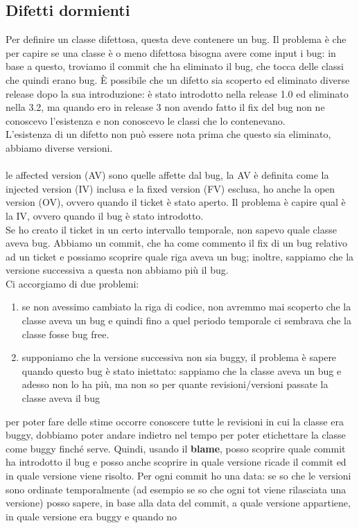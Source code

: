 \documentclass{article}
\begin{document}
\subsection{Difetti dormienti}
Per definire un classe difettosa, questa deve contenere un bug. Il problema è che per capire se una classe è o meno difettosa bisogna avere come input i bug: in base a questo, troviamo il commit che ha eliminato il bug, che tocca delle classi che quindi erano bug. È possibile che un difetto sia scoperto ed eliminato diverse release dopo la sua introduzione: è stato introdotto nella release 1.0 ed eliminato nella 3.2, ma quando ero in release 3 non avendo fatto il fix del bug non ne conoscevo l'esistenza e non conoscevo le classi che lo contenevano.\\ L'esistenza di un difetto non può essere nota prima che questo sia eliminato, abbiamo diverse versioni.\\
\\
le affected version (AV) sono quelle affette dal bug, la AV è definita come la injected version (IV) inclusa e la fixed version (FV) esclusa, ho anche la open version (OV), ovvero quando il ticket è stato aperto. Il problema è capire qual è la IV, ovvero quando il bug è stato introdotto.\\
Se ho creato il ticket in un certo intervallo temporale, non sapevo quale classe aveva bug. Abbiamo un commit, che ha come commento il fix di un bug relativo ad un ticket e possiamo scoprire quale riga aveva un bug; inoltre, sappiamo che la versione successiva a questa non abbiamo più il bug.\\ Ci accorgiamo di due problemi:
\begin{enumerate}
\item se non avessimo cambiato la riga di codice, non avremmo mai scoperto che la classe aveva un bug e quindi fino a quel periodo temporale ci sembrava che la classe fosse bug free.
\item supponiamo che la versione successiva non sia buggy, il problema è sapere quando questo bug è stato iniettato: sappiamo che la classe aveva un bug e adesso non lo ha più, ma non so per quante revisioni/versioni passate la classe aveva il bug
\end{enumerate}
per poter fare delle stime occorre conoscere tutte le revisioni in cui la classe era buggy, dobbiamo poter andare indietro nel tempo per poter etichettare la classe come buggy finché serve. Quindi, usando il \textbf{blame}, posso scoprire quale commit ha introdotto il bug e posso anche scoprire in quale versione ricade il commit ed in quale versione viene risolto. Per ogni commit ho una data: se so che le versioni sono ordinate temporalmente (ad esempio se so che ogni tot viene rilasciata una versione) posso sapere, in base alla data del commit, a quale versione appartiene, in quale versione era buggy e quando no
\end{document}
